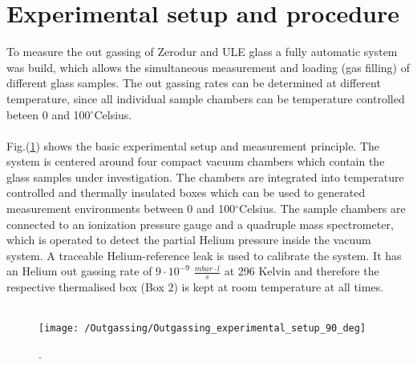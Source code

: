 \section{Experimental setup and procedure}
To measure the out gassing of Zerodur and ULE glass a fully automatic system was build, which allows the simultaneous measurement and loading (gas filling) of different glass samples. The out gassing rates can be determined at different temperature, since all individual sample chambers can be temperature controlled beteen 0 and 100$^\circ$Celsius.\\ \\
\noindent
Fig.(\ref{fig:outgassing_exp_setup}) shows the basic experimental setup and measurement principle. The system is centered around four compact vacuum chambers which contain the glass samples under investigation. The chambers are integrated into temperature controlled and thermally insulated boxes which can be used to generated measurement environments between 0 and 100$^\circ$Celsius. The sample chambers are connected to an ionization pressure gauge and a quadruple mass spectrometer, which is operated to detect the partial Helium pressure inside the vacuum system. A traceable Helium-reference leak is used to calibrate the system. It has an Helium out gassing rate of $9\cdot10^{-9}$ $\frac{mbar \cdot l}{s}$ at 296 Kelvin and therefore the respective thermalised box (Box 2) is kept at room temperature at all times. \\\\
\noindent
\begin{figure}[H]
	\centering
	\texttt{[image: /Outgassing/Outgassing\_experimental\_setup\_90\_deg]}
	\caption{.}
	\label{fig:outgassing_exp_setup}
\end{figure}

